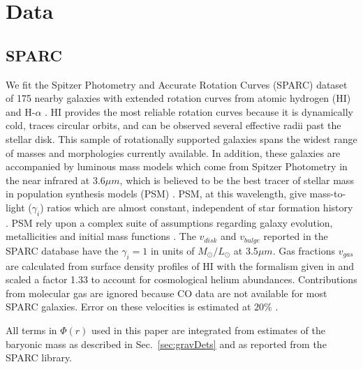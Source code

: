 \documentclass[reprint,%
 amsmath,amssymb,
 aps,
]{revtex4-1}
\begin{document}
\section{Data \label{sec:data}}
 
 \subsection{SPARC }
 We fit the Spitzer Photometry and Accurate Rotation Curves (SPARC) dataset  of  175 nearby galaxies with extended rotation curves from atomic hydrogen (HI)  and H-$\alpha$ \cite{2016Lelli}. 
 HI provides the most reliable
 rotation curves because it is dynamically cold, traces circular orbits, and can be observed several effective radii past the stellar disk. 
 This sample of rotationally supported galaxies   spans the widest range of masses and morphologies currently available. 
 In addition, these galaxies are  accompanied by luminous mass models which come from   Spitzer Photometry in the 
   near infrared  at 3.6$\mu m$, which is   believed to be the best tracer of stellar mass   in population synthesis models (PSM) \cite{10.1093/mnras/sty3223}.  PSM, at this wavelength,   give mass-to-light ($\gamma_i$) ratios which are almost constant, independent of star formation history \cite{BelldYong,10.1093/mnras/sty3223}. PSM rely upon a complex  suite of  assumptions regarding galaxy evolution, metallicities and initial mass functions  \cite{BelldYong,10.1093/mnras/sty3223}.   The $v_{disk}$ and $v_{bulge}$   reported in the SPARC database have the  $ \gamma_i = 1$ in units of  $M_{\odot} / L_{\odot}$   at 3.5$\mu m$.
     Gas fractions $v_{gas}$ are calculated from surface density profiles of HI  with the formalism given in  \cite{1983MNRAS.203..735C} and scaled 
     a factor 1.33 to account for cosmological helium abundances.  
     Contributions from molecular gas are ignored   because CO data are not available for most SPARC galaxies. 
     Error on these velocities is estimated at $20\%$ \cite{2016Lelli}. 

   
   
     All terms in $\Phi(r)$ used in this paper  are    integrated from estimates of the baryonic mass as described in Sec.~\ref{sec:gravDets} and as reported  from the      SPARC  library.    

 
   
     
      
  
 

  
 
\end{document}
